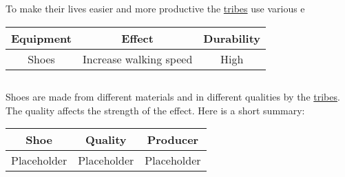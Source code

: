 \section{}\label{ch:Goods:Equipment} %
To make their lives easier and more productive the \hyperref[ch:Tribes]{tribes} use various e
\begin{longtable}{ccc}
	\toprule
	\Gls*{Equipment} & Effect                 & Durability \\
	\midrule
	\Glspl{Shoe}     & Increase walking speed & High       \\
	\bottomrule
\end{longtable}

\subsection{}
\Glspl{Shoe} are made from different materials and in different qualities by the
\hyperref[ch:Tribes]{tribes}. The quality affects the strength of the effect. Here is a short summary:

\begin{longtable}{ccc}
	\toprule
	\Gls*{Shoe} & Quality     & Producer    \\
	\midrule
	Placeholder & Placeholder & Placeholder \\
	\bottomrule
\end{longtable}
